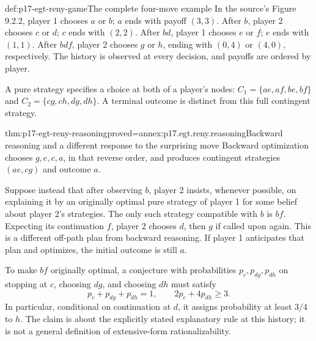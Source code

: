 \begin{hbdefinition}{def:p17-egt-reny-game}{The complete four-move example}
In the source's Figure 9.2.2, player 1 chooses \(a\) or \(b\);
\(a\) ends with payoff \((3,3)\). After \(b\), player 2 chooses
\(c\) or \(d\); \(c\) ends with \((2,2)\). After \(bd\), player 1
chooses \(e\) or \(f\); \(e\) ends with \((1,1)\).
After \(bdf\), player 2 chooses \(g\) or \(h\), ending with
\((0,4)\) or \((4,0)\), respectively. The history is observed at
every decision, and payoffs are ordered by player.

A pure strategy specifies a choice at both of a player's nodes:
\(C_1=\{ae,af,be,bf\}\) and \(C_2=\{cg,ch,dg,dh\}\).
A terminal outcome is distinct from this full contingent strategy.
\end{hbdefinition}

\begin{hbtheorem}{thm:p17-egt-reny-reasoning}{proved=annex:p17.egt.reny.reasoning}{Backward reasoning and a different response to the surprising move}
Backward optimization chooses \(g,e,c,a\), in that reverse order,
and produces contingent strategies \((ae,cg)\) and outcome \(a\).

Suppose instead that after observing \(b\), player 2 insists,
whenever possible, on explaining it by an originally optimal
pure strategy of player 1 for some belief about player 2's
strategies. The only such strategy compatible with \(b\) is \(bf\).
Expecting its continuation \(f\), player 2 chooses \(d\), then \(g\)
if called upon again. This is a different off-path plan from
backward reasoning. If player 1 anticipates that plan and
optimizes, the initial outcome is still \(a\).

To make \(bf\) originally optimal, a conjecture with probabilities
\(p_c,p_{dg},p_{dh}\) on stopping at \(c\), choosing \(dg\), and
choosing \(dh\) must satisfy
\[
 p_c+p_{dg}+p_{dh}=1,\qquad
                 2p_c+4p_{dh}\geq3 .
\]
In particular, conditional on continuation at \(d\), it assigns
probability at least \(3/4\) to \(h\).
The claim is about the explicitly stated explanatory rule at this
history; it is not a general definition of extensive-form rationalizability.
\end{hbtheorem}

